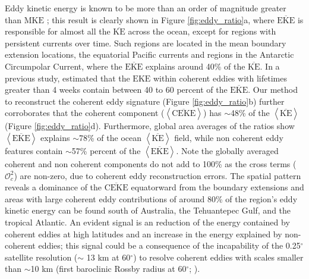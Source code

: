 \documentclass[draft,linenumbers]{agujournal2019}
\newcommand{\MKE}{\overline{\textrm{KE}}}
\newcommand{\mKE}{\textrm{MKE}}
\newcommand{\MEKE}{\overline{\textrm{EKE}}}
\newcommand{\EKE}{\textrm{EKE}}
\newcommand{\MCEKE}{\overline{\textrm{CEKE}}}
\newcommand{\CEKE}{\textrm{CEKE}}
\begin{document}
	Eddy kinetic energy is known to be more than an order of magnitude greater than $\mKE$ \citep{Gill_Energy_1974}; this result is clearly shown in Figure \ref{fig:eddy_ratio}a, where $\MEKE$ is responsible for almost all the $\MKE$ across the ocean, except for regions with persistent currents over time. 
	Such regions are located in the mean boundary extension locations, the equatorial Pacific currents and regions in the Antarctic Circumpolar Current, where the $\MEKE$ explains around 40\% of the $\MKE$. 
	In a previous study, \citet{Chelton_The_2011} estimated that the $\EKE$ within coherent eddies with lifetimes greater than 4 weeks contain between 40 to 60 percent of the $\MEKE$. 
	Our method to reconstruct the coherent eddy signature (Figure \ref{fig:eddy_ratio}b) further corroborates that the coherent component ($\left<\MCEKE\right>$) has $\sim$48\% of the $\left<\MKE\right>$ (Figure \ref{fig:eddy_ratio}d). 
	Furthermore, global area averages of the ratios show $\left<\MEKE\right>$ explains $\sim$78\% of the ocean $\left<\MKE\right>$ field, while non coherent eddy features contain $\sim$57\% percent of the $\left<\MEKE\right>$. 
	Note the globally averaged coherent and non coherent components do not add to 100\% as the cross terms ($\mathcal{O}_c^2$) are non-zero, due to coherent eddy reconstruction errors.
	The spatial pattern reveals a dominance of the $\MCEKE$ equatorward from the boundary extensions and areas with large coherent eddy contributions of around 80\% of the region's eddy kinetic energy can be found south of Australia, the Tehuantepec Gulf, and the tropical Atlantic. 
	An evident signal is an reduction of the energy contained by coherent eddies at high latitudes and an increase in the energy explained by non-coherent eddies; this signal could be a consequence of the incapability of the 0.25$^\circ$ satellite resolution ($\sim$ 13 km at 60$^\circ$) to resolve coherent eddies with scales smaller than $\sim$10 km (first baroclinic Rossby radius at 60$^\circ$; \citealt{Chelton_Geographical_1998}).


\end{document}
